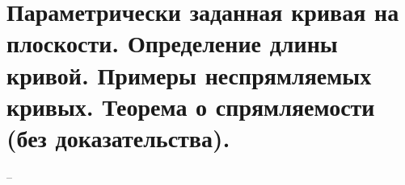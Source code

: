 \section{Параметрически заданная кривая на плоскости. Определение длины кривой. Примеры неспрямляемых кривых. Теорема о спрямляемости (без доказательства).}
--
\newline